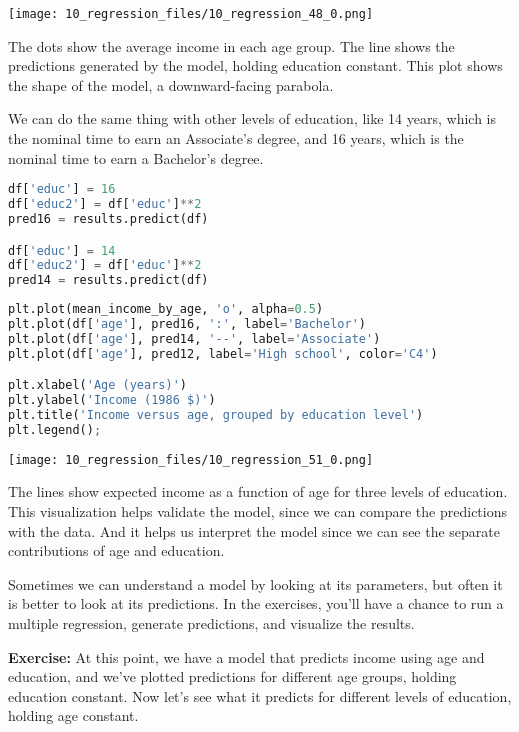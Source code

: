 \begin{center}
\texttt{[image: 10\_regression\_files/10\_regression\_48\_0.png]}
\end{center}

The dots show the average income in each age group. The line shows the
predictions generated by the model, holding education constant. This
plot shows the shape of the model, a downward-facing parabola.

We can do the same thing with other levels of education, like 14 years,
which is the nominal time to earn an Associate's degree, and 16 years,
which is the nominal time to earn a Bachelor's degree.

\begin{lstlisting}[language=Python,style=source]
df['educ'] = 16
df['educ2'] = df['educ']**2
pred16 = results.predict(df)

df['educ'] = 14
df['educ2'] = df['educ']**2
pred14 = results.predict(df)
\end{lstlisting}

\pagebreak

\begin{lstlisting}[language=Python,style=source]
plt.plot(mean_income_by_age, 'o', alpha=0.5)
plt.plot(df['age'], pred16, ':', label='Bachelor')
plt.plot(df['age'], pred14, '--', label='Associate')
plt.plot(df['age'], pred12, label='High school', color='C4')

plt.xlabel('Age (years)')
plt.ylabel('Income (1986 $)')
plt.title('Income versus age, grouped by education level')
plt.legend();
\end{lstlisting}

\begin{center}
\texttt{[image: 10\_regression\_files/10\_regression\_51\_0.png]}
\end{center}

The lines show expected income as a function of age for three levels of
education. This visualization helps validate the model, since we can
compare the predictions with the data. And it helps us interpret the
model since we can see the separate contributions of age and education.

Sometimes we can understand a model by looking at its parameters, but
often it is better to look at its predictions. In the exercises, you'll
have a chance to run a multiple regression, generate predictions, and
visualize the results.

\textbf{Exercise:} At this point, we have a model that predicts income
using age and education, and we've plotted predictions for different age
groups, holding education constant. Now let's see what it predicts for
different levels of education, holding age constant.


